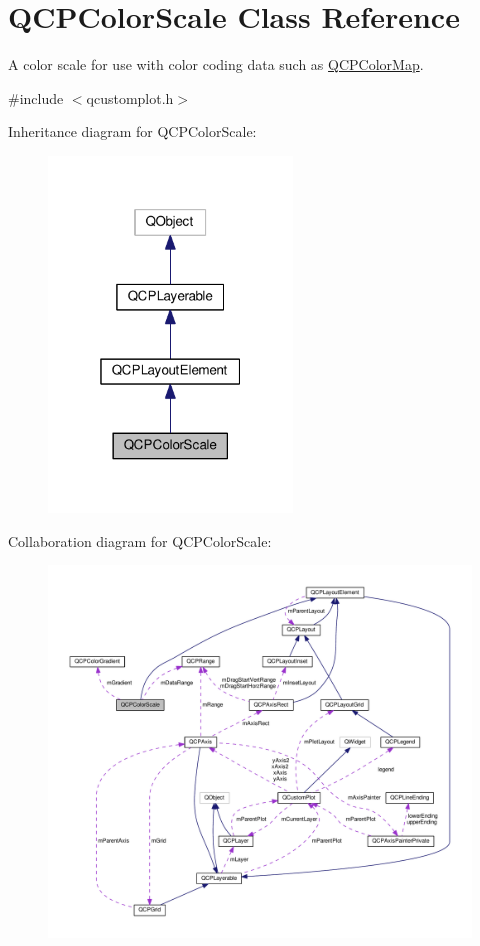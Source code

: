 \hypertarget{classQCPColorScale}{}\section{Q\+C\+P\+Color\+Scale Class Reference}
\label{classQCPColorScale}


A color scale for use with color coding data such as \hyperlink{classQCPColorMap}{Q\+C\+P\+Color\+Map}.  




{\ttfamily \#include $<$qcustomplot.\+h$>$}



Inheritance diagram for Q\+C\+P\+Color\+Scale\+:\nopagebreak
\begin{figure}[H]
\begin{center}
\leavevmode
\includegraphics[width=184pt]{classQCPColorScale__inherit__graph}
\end{center}
\end{figure}


Collaboration diagram for Q\+C\+P\+Color\+Scale\+:\nopagebreak
\begin{figure}[H]
\begin{center}
\leavevmode
\includegraphics[width=350pt]{classQCPColorScale__coll__graph}
\end{center}
\end{figure}
